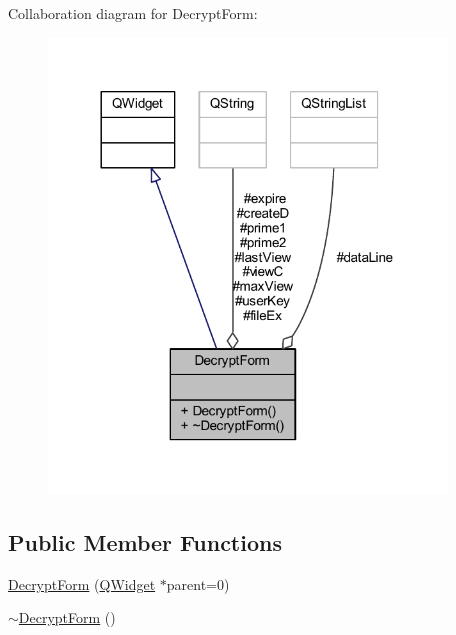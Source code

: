 Collaboration diagram for Decrypt\+Form\+:\nopagebreak
\begin{figure}[H]
\begin{center}
\leavevmode
\includegraphics[width=300pt]{class_decrypt_form__coll__graph}
\end{center}
\end{figure}
\subsection*{Public Member Functions}
\begin{DoxyCompactItemize}
\item 
\hyperlink{class_decrypt_form_adedf517dfb4bb9411c4caf92943e7033}{Decrypt\+Form} (\hyperlink{class_q_widget}{Q\+Widget} $\ast$parent=0)
\item 
\hyperlink{class_decrypt_form_acbf539168ee44015720d6edb380ec4cf}{$\sim$\+Decrypt\+Form} ()
\end{DoxyCompactItemize}
